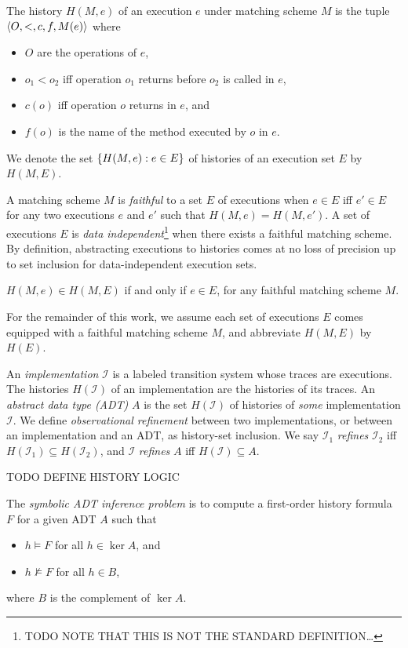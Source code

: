 The history $H(M,e)$ of an execution $e$ under matching scheme $M$ is the tuple
${\left\langle{O,<,c,f,M(e)}\right\rangle}$ where
\begin{itemize}

  \item $O$ are the operations of $e$,

  \item $o_1 < o_2$ if{f} operation $o_1$ returns before $o_2$ is called in $e$,

  \item $c(o)$ if{f} operation $o$ returns in $e$, and

  \item $f(o)$ is the name of the method executed by $o$ in $e$.

\end{itemize}
We denote the set ${\{{H(M,e) : e \in E}\}}$ of histories of an execution set $E$
by $H(M,E)$.

A matching scheme $M$ is \emph{faithful} to a set $E$ of executions when $e \in
E$ if{f} $e' \in E$ for any two executions $e$ and $e'$ such that $H(M,e) =
H(M,e')$. A set of executions $E$ is \emph{data independent}\footnote{TODO NOTE
THAT THIS IS NOT THE STANDARD DEFINITION…} when there exists a faithful
matching scheme. By definition, abstracting executions to histories comes at no
loss of precision up to set inclusion for data-independent execution sets.

\begin{lemma}

  $H(M,e) \in H(M,E)$ if and only if $e \in E$, for any faithful matching
  scheme $M$.

\end{lemma}

For the remainder of this work, we assume each set of executions $E$ comes
equipped with a faithful matching scheme $M$, and abbreviate $H(M,E)$ by $H(E)$.

An \emph{implementation} $\mathcal{I}$ is a labeled transition system whose
traces are executions. The histories $H(\mathcal{I})$ of an implementation are
the histories of its traces. An \emph{abstract data type (ADT)} $A$ is the set
$H(\mathcal{I})$ of histories of \emph{some} implementation $\mathcal{I}$. We
define \emph{observational refinement} between two implementations, or between
an implementation and an ADT, as history-set inclusion. We say $\mathcal{I}_1$
\emph{refines} $\mathcal{I}_2$ if{f} $H(\mathcal{I}_1) \subseteq
H(\mathcal{I}_2)$, and $\mathcal{I}$ \emph{refines} $A$ if{f} $H(\mathcal{I})
\subseteq A$.

TODO DEFINE HISTORY LOGIC

The \emph{symbolic ADT inference problem} is to compute a first-order history
formula $F$ for a given ADT $A$ such that
\begin{itemize}

  \item $h \models F$ for all $h \in \ker A$, and

  \item $h \not\models F$ for all $h \in B$,

\end{itemize}
where $B$ is the complement of $\ker A$.

